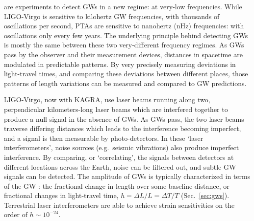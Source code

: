 \documentclass[onecolumn,authoryear]{els-mrw}
\begin{document}
 are experiments to detect GWs in a new regime: at very-low frequencies.  While LIGO-Virgo is sensitive to kilohertz GW frequencies, with thousands of oscillations per second, PTAs are sensitive to nanohertz (nHz) frequencies: with oscillations only every few years.  The underlying principle behind detecting GWs is mostly the same between these two very-different frequency regimes.  As GWs pass by the observer and their measurement devices, distances in spacetime are modulated in predictable patterns.  By very precisely measuring deviations in light-travel times, and comparing these deviations between different places, those patterns of length variations can be measured and compared to GW predictions.

LIGO-Virgo, now with KAGRA, use laser beams running along two, perpendicular kilometers-long laser beams which are interfered together to produce a null signal in the absence of GWs.  As GWs pass, the two laser beams traverse differing distances which leads to the interference becoming imperfect, and a signal is then measurable by photo-detectors.  In these `laser interferometers', noise sources (e.g.~seismic vibrations) also produce imperfect interference.  By comparing, or `correlating', the signals between detectors at different locations across the Earth, noise can be filtered out, and subtle GW signals can be detected.  The amplitude of GWs is typically characterized in terms of the GW : the fractional change in length over some baseline distance, or fractional changes in light-travel time, $h = \Delta L / L = \Delta T / T$ (Sec.~\ref{sec:gws}).  Terrestrial laser interferometers are able to achieve strain sensitivities on the order of $h \sim 10^{-24}$.
\end{document}
